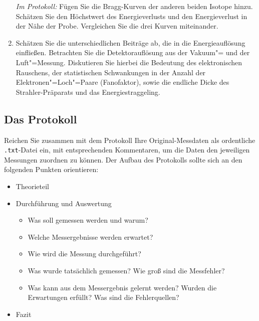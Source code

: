 \begin{enumerate}[label=\textbf{\alph*)}]
	\textit{Im Protokoll:} Fügen Sie die Bragg-Kurven der anderen beiden Isotope hinzu. Schätzen Sie den Höchstwert des Energieverlusts und den Energieverlust in der Nähe der Probe. Vergleichen Sie die drei Kurven miteinander.
	\item Schätzen Sie die unterschiedlichen Beiträge ab, die in die Energieauflösung einfließen. Betrachten Sie die Detektorauflösung aus der Vakuum"= und der Luft"=Messung. Diskutieren Sie hierbei die Bedeutung des elektronischen Rauschens, der statistischen Schwankungen in der Anzahl der Elektronen"=Loch"=Paare (Fanofaktor), sowie die endliche Dicke des Strahler-Präparats und das Energiestraggeling.
\end{enumerate}
%
%
\subsection{Das Protokoll}
Reichen Sie zusammen mit dem Protokoll Ihre Original-Messdaten als ordentliche \texttt{.txt}-Datei ein, mit entsprechenden Kommentaren, um die Daten den jeweiligen Messungen zuordnen zu können. Der Aufbau des Protokolls sollte sich an den folgenden Punkten orientieren: 
%
\begin{itemize}
	\item Theorieteil
	\item Durchführung und Auswertung
	\begin{itemize}
		\item Was soll gemessen werden und warum?
		\item Welche Messergebnisse werden erwartet?
		\item Wie wird die Messung durchgeführt?
		\item Was wurde tatsächlich gemessen? Wie groß sind die Messfehler?
		\item Was kann aus dem Messergebnis gelernt werden? Wurden die Erwartungen erfüllt? Was sind die Fehlerquellen?
	\end{itemize}
	\item Fazit
\end{itemize}
%
